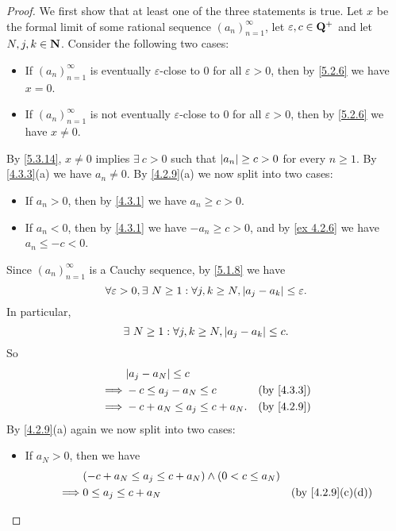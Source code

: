 \begin{proof}
  We first show that at least one of the three statements is true.
  Let \(x\) be the formal limit of some rational sequence \((a_n)_{n = 1}^{\infty}\), let \(\varepsilon, c \in \mathbf{Q}^+\) and let \(N, j, k \in \mathbf{N}\).
  Consider the following two cases:
  \begin{itemize}
    \item If \((a_n)_{n = 1}^{\infty}\) is eventually \(\varepsilon\)-close to \(0\) for all \(\varepsilon > 0\), then by \cref{5.2.6} we have \(x = 0\).
    \item If \((a_n)_{n = 1}^{\infty}\) is not eventually \(\varepsilon\)-close to \(0\) for all \(\varepsilon > 0\), then by \cref{5.2.6} we have \(x \neq 0\).
  \end{itemize}
  By \cref{5.3.14}, \(x \neq 0\) implies \(\exists\ c > 0\) such that \(\left\lvert a_n\right\rvert \geq c > 0\) for every \(n \geq 1\).
  By \cref{4.3.3}(a) we have \(a_n \neq 0\).
  By \cref{4.2.9}(a) we now split into two cases:
  \begin{itemize}
    \item If \(a_n > 0\), then by \cref{4.3.1} we have \(a_n \geq c > 0\).
    \item If \(a_n < 0\), then by \cref{4.3.1} we have \(-a_n \geq c > 0\), and by \cref{ex 4.2.6} we have \(a_n \leq -c < 0\).
  \end{itemize}
  Since \((a_n)_{n = 1}^{\infty}\) is a Cauchy sequence, by \cref{5.1.8} we have
  \[
    \forall \varepsilon > 0, \exists\ N \geq 1 : \forall j, k \geq N, \left\lvert a_j - a_k\right\rvert \leq \varepsilon.
  \]
  In particular,
  \[
    \exists\ N \geq 1 : \forall j, k \geq N, \left\lvert a_j - a_k\right\rvert \leq c.
  \]
  So
  \begin{align*}
             & \abs{a_j - a_N} \leq c                                     \\
    \implies & -c \leq a_j - a_N \leq c        & \text{(by \cref{4.3.3})} \\
    \implies & -c + a_N \leq a_j \leq c + a_N. & \text{(by \cref{4.2.9})} \\
  \end{align*}
  By \cref{4.2.9}(a) again we now split into two cases:
  \begin{itemize}
    \item If \(a_N > 0\), then we have
          \begin{align*}
                     & (-c + a_N \leq a_j \leq c + a_N) \land (0 < c \leq a_N)                                  \\
            \implies & 0 \leq a_j \leq c + a_N                                 & \text{(by \cref{4.2.9}(c)(d))} \\

\end{align*}
\end{itemize}
\end{proof}

